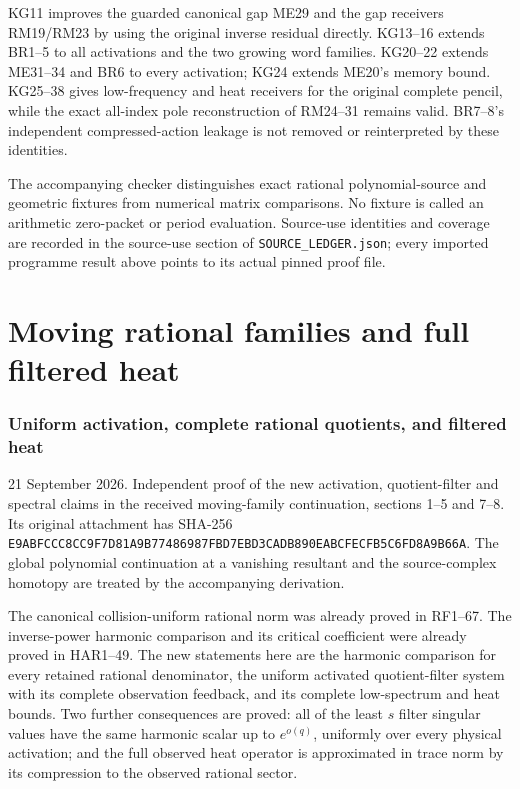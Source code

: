 \documentclass[11pt]{article}
\begin{document}
KG11 improves the guarded canonical gap ME29 and the gap receivers RM19/RM23 by using the original inverse residual directly. KG13--16 extends BR1--5 to all activations and the two growing word families. KG20--22 extends ME31--34 and BR6 to every activation; KG24 extends ME20's memory bound. KG25--38 gives low-frequency and heat receivers for the original complete pencil, while the exact all-index pole reconstruction of RM24--31 remains valid. BR7--8's independent compressed-action leakage is not removed or reinterpreted by these identities.

The accompanying checker distinguishes exact rational polynomial-source and geometric fixtures from numerical matrix comparisons. No fixture is called an arithmetic zero-packet or period evaluation. Source-use identities and coverage are recorded in the source-use section of \texttt{SOURCE\_LEDGER.json}; every imported programme result above points to its actual pinned proof file.


\clearpage\part{Moving rational families and full filtered heat}
\section{Uniform activation, complete rational quotients, and filtered heat}\label{uniform-activation-complete-rational-quotients-and-filtered-heat}

21 September 2026. Independent proof of the new activation, quotient-filter and spectral claims in the received moving-family continuation, sections 1--5 and 7--8. Its original attachment has SHA-256 \nolinkurl{E9ABFCCC8CC9F7D81A9B77486987FBD7EBD3CADB890EABCFECFB5C6FD8A9B66A}. The global polynomial continuation at a vanishing resultant and the source-complex homotopy are treated by the accompanying derivation.

The canonical collision-uniform rational norm was already proved in RF1--67. The inverse-power harmonic comparison and its critical coefficient were already proved in HAR1--49. The new statements here are the harmonic comparison for every retained rational denominator, the uniform activated quotient-filter system with its complete observation feedback, and its complete low-spectrum and heat bounds. Two further consequences are proved: all of the least \(s\) filter singular values have the same harmonic scalar up to \(e^{o(q)}\), uniformly over every physical activation; and the full observed heat operator is approximated in trace norm by its compression to the observed rational sector.
\end{document}
